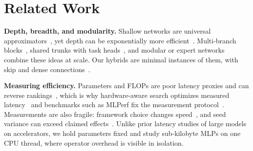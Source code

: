 \section{Related Work}
\label{sec:related}

\textbf{Depth, breadth, and modularity.} Shallow networks are universal
approximators~\cite{cybenko1989approximation}, yet depth can be exponentially more
efficient~\cite{eldan2016power,telgarsky2016benefits}. Multi-branch blocks~\cite{szegedy2015going,xie2017resnext},
shared trunks with task heads~\cite{caruana1997multitask}, and modular or expert
networks~\cite{jacobs1991adaptive,shazeer2017outrageously,andreas2016neural,pfeiffer2023modular} combine these
ideas at scale. Our hybrids are minimal instances of them, with skip and dense
connections~\cite{he2016resnet,huang2017densenet}.

\textbf{Measuring efficiency.} Parameters and FLOPs are poor latency proxies and can reverse
rankings~\cite{ma2018shufflenetv2,dehghani2022efficiency}, which is why hardware-aware search optimizes measured
latency~\cite{tan2019mnasnet} and benchmarks such as MLPerf fix the measurement
protocol~\cite{reddi2020mlperf,banbury2021mlperftiny}. Measurements are also fragile: framework choice changes
speed~\cite{shi2016benchmarking}, and seed variance can exceed claimed effects~\cite{bouthillier2021accounting,lipton2019troubling}.
Unlike prior latency studies of large models on accelerators, we hold parameters fixed and study sub-kilobyte
MLPs on one CPU thread, where operator overhead is visible in isolation.
